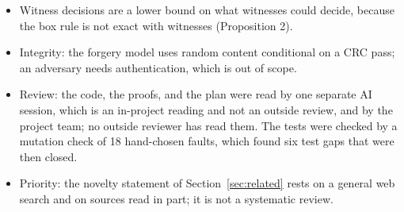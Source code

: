\begin{itemize}
  \item Witness decisions are a lower bound on what witnesses could decide, because the box rule is not exact with witnesses (Proposition 2).
  \item Integrity: the forgery model uses random content conditional on a CRC pass; an adversary needs authentication, which is out of scope.
  \item Review: the code, the proofs, and the plan were read by one separate AI session, which is an in-project reading and not an outside review, and by the project team; no outside reviewer has read them. The tests were checked by a mutation check of 18 hand-chosen faults, which found six test gaps that were then closed.
  \item Priority: the novelty statement of Section~\ref{sec:related} rests on a general web search and on sources read in part; it is not a systematic review.
\end{itemize}
